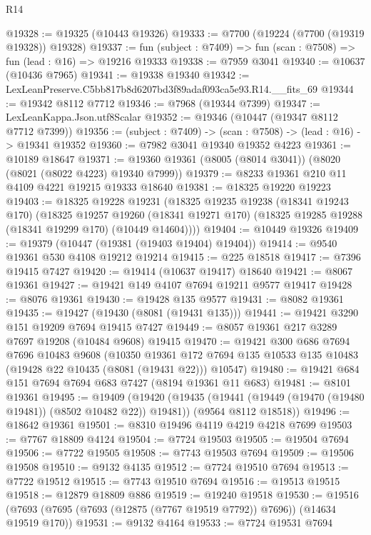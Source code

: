 \begin{lexlean}{R14}
\begin{coremodule}
@19328 := @19325 (@10443 @19326)
@19333 := @7700 (@19224 (@7700 (@19319 @19328)) @19328)
@19337 := fun (subject : @7409) => fun (scan : @7508) => fun (lead : @16) => @19216 @19333
@19338 := @7959 @3041
@19340 := @10637 (@10436 @7965)
@19341 := @19338 @19340
@19342 := LexLeanPreserve.C5bb817b8d6207bd3f89adaf093ca5e93.R14.__fits_69
@19344 := @19342 @8112 @7712
@19346 := @7968 (@19344 @7399)
@19347 := LexLeanKappa.Json.utf8Scalar
@19352 := @19346 (@10447 (@19347 @8112 @7712 @7399))
@19356 := (subject : @7409) -> (scan : @7508) -> (lead : @16) -> @19341 @19352
@19360 := @7982 @3041 @19340 @19352 @4223
@19361 := @10189 @18647
@19371 := @19360 @19361 (@8005 (@8014 @3041)) (@8020 (@8021 (@8022 @4223) @19340 @7999))
@19379 := @8233 @19361 @210 @11 @4109 @4221 @19215 @19333 @18640
@19381 := @18325 @19220 @19223
@19403 := @18325
    @19228
    @19231
    (@18325
      @19235
      @19238
      (@18341 @19243 @170)
      (@18325
        @19257
        @19260
        (@18341 @19271 @170)
        (@18325 @19285 @19288 (@18341 @19299 @170) (@10449 @14604))))
@19404 := @10449 @19326
@19409 := @19379 (@10447 (@19381 (@19403 @19404) @19404))
@19414 := @9540 @19361 @530 @4108 @19212 @19214
@19415 := @225 @18518
@19417 := @7396 @19415 @7427
@19420 := @19414 (@10637 @19417) @18640
@19421 := @8067 @19361
@19427 := @19421 @149 @4107 @7694 @19211 @9577 @19417
@19428 := @8076 @19361
@19430 := @19428 @135 @9577
@19431 := @8082 @19361
@19435 := @19427 (@19430 (@8081 (@19431 @135)))
@19441 := @19421 @3290 @151 @19209 @7694 @19415 @7427
@19449 := @8057 @19361 @217 @3289 @7697 @19208 (@10484 @9608) @19415
@19470 := @19421
    @300
    @686
    @7694
    @7696
    @10483
    @9608
    (@10350
      @19361
      @172
      @7694
      @135
      @10533
      @135
      @10483
      (@19428 @22 @10435 (@8081 (@19431 @22)))
      @10547)
@19480 := @19421 @684 @151 @7694 @7694 @683 @7427 (@8194 @19361 @11 @683)
@19481 := @8101 @19361
@19495 := @19409
    (@19420
      (@19435 (@19441 (@19449 (@19470 (@19480 @19481)) (@8502 @10482 @22)) @19481))
      (@9564 @8112 @18518))
@19496 := @18642 @19361
@19501 := @8310 @19496 @4119 @4219 @4218 @7699
@19503 := @7767 @18809 @4124
@19504 := @7724 @19503
@19505 := @19504 @7694
@19506 := @7722 @19505
@19508 := @7743 @19503 @7694
@19509 := @19506 @19508
@19510 := @9132 @4135
@19512 := @7724 @19510 @7694
@19513 := @7722 @19512
@19515 := @7743 @19510 @7694
@19516 := @19513 @19515
@19518 := @12879 @18809 @886
@19519 := @19240 @19518
@19530 := @19516 (@7693 (@7695 (@7693 (@12875 (@7767 @19519 @7792)) @7696)) (@14634 @19519 @170))
@19531 := @9132 @4164
@19533 := @7724 @19531 @7694

\end{coremodule}
\end{lexlean}
